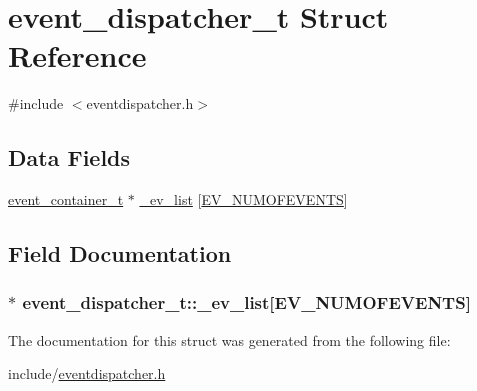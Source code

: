 \hypertarget{structevent__dispatcher__t}{}\section{event\+\_\+dispatcher\+\_\+t Struct Reference}
\label{structevent__dispatcher__t}


{\ttfamily \#include $<$eventdispatcher.\+h$>$}

\subsection*{Data Fields}
\begin{DoxyCompactItemize}
\item 
\hyperlink{structevent__container__t}{event\+\_\+container\+\_\+t} $\ast$ \hyperlink{structevent__dispatcher__t_a43b47329e5ca364167439001c76a781a}{\+\_\+ev\+\_\+list} \mbox{[}\hyperlink{eventdispatcher_8h_a2fb9b58e4e5f14f40af8b4a1425841f8a47f5fbee1bafda11f2f514e688f146c8}{E\+V\+\_\+\+N\+U\+M\+O\+F\+E\+V\+E\+N\+TS}\mbox{]}
\end{DoxyCompactItemize}


\subsection{Field Documentation}
\subsubsection[{\texorpdfstring{\+\_\+ev\+\_\+list}{\_ev\_list}}]{$\ast$ event\+\_\+dispatcher\+\_\+t\+::\+\_\+ev\+\_\+list\mbox{[}{\bf E\+V\+\_\+\+N\+U\+M\+O\+F\+E\+V\+E\+N\+TS}\mbox{]}}\hypertarget{structevent__dispatcher__t_a43b47329e5ca364167439001c76a781a}{}\label{structevent__dispatcher__t_a43b47329e5ca364167439001c76a781a}


The documentation for this struct was generated from the following file\+:\begin{DoxyCompactItemize}
\item 
include/\hyperlink{eventdispatcher_8h}{eventdispatcher.\+h}\end{DoxyCompactItemize}
